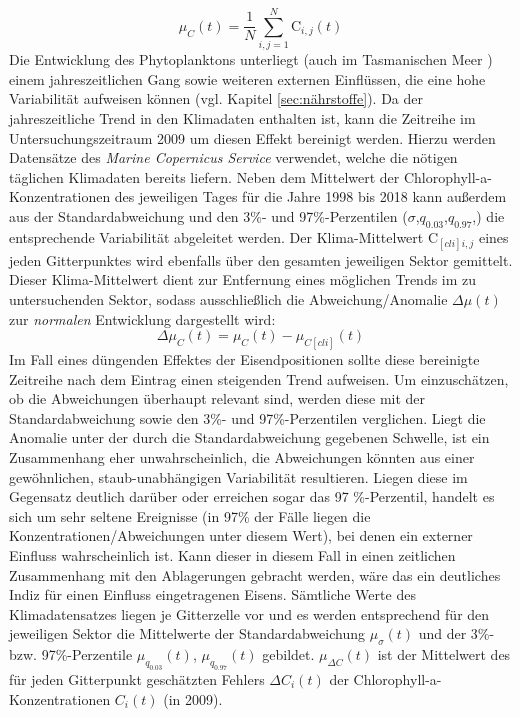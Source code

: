 \documentclass[12pt,a4paper,onecolumn,headheight=30pt]{scrartcl}
\begin{document}
\begin{equation}
\mu_C(t) = \frac{1}{N}\sum\limits_{i,j=1}^{N} \text{C}_{i,j}(t)
\end{equation}
Die Entwicklung des Phytoplanktons unterliegt (auch im Tasmanischen Meer \citep{Tilburg.2002}) einem jahreszeitlichen Gang sowie weiteren externen Einflüssen, die eine hohe Variabilität aufweisen können (vgl. Kapitel \ref{sec:nährstoffe}). Da der jahreszeitliche Trend in den Klimadaten enthalten ist, kann die Zeitreihe im Untersuchungszeitraum 2009 um diesen Effekt bereinigt werden. Hierzu werden Datensätze des \textit{Marine Copernicus Service} verwendet, welche die nötigen täglichen Klimadaten bereits liefern. Neben dem Mittelwert der Chlorophyll-a-Konzentrationen des jeweiligen Tages für die Jahre 1998 bis 2018 kann außerdem aus der Standardabweichung und den 3\%- und 97\%-Perzentilen ($\sigma$,$q_{0.03}$,$q_{0.97}$,) die entsprechende Variabilität abgeleitet werden. Der Klima-Mittelwert $\text{C}_{[cli]i,j}$ eines jeden Gitterpunktes wird ebenfalls über den gesamten jeweiligen Sektor gemittelt. Dieser Klima-Mittelwert dient zur Entfernung eines möglichen Trends im zu untersuchenden Sektor, sodass ausschließlich die Abweichung/Anomalie $\Delta \mu(t)$ zur \textit{normalen} Entwicklung dargestellt wird:
\begin{equation}
\Delta \mu_C(t) = \mu_C(t) - \mu_{C[cli]}(t) \label{eq:cli_anomalie}
\end{equation} 
Im Fall eines düngenden Effektes der Eisendpositionen sollte diese bereinigte Zeitreihe nach dem Eintrag einen steigenden Trend aufweisen. Um einzuschätzen, ob die Abweichungen überhaupt relevant sind, werden diese mit der Standardabweichung sowie den 3\%- und 97\%-Perzentilen verglichen. Liegt die Anomalie unter der durch die Standardabweichung gegebenen Schwelle, ist ein Zusammenhang eher unwahrscheinlich, die Abweichungen könnten aus einer gewöhnlichen, staub-unabhängigen Variabilität resultieren. Liegen diese im Gegensatz deutlich darüber oder erreichen sogar das 97 \%-Perzentil, handelt es sich um sehr seltene Ereignisse (in 97\% der Fälle liegen die Konzentrationen/Abweichungen unter diesem Wert), bei denen ein externer Einfluss wahrscheinlich ist. Kann dieser in diesem Fall in einen zeitlichen Zusammenhang mit den Ablagerungen gebracht werden, wäre das ein deutliches Indiz für einen Einfluss eingetragenen Eisens. Sämtliche Werte des Klimadatensatzes liegen je Gitterzelle vor und es werden entsprechend für den jeweiligen Sektor die Mittelwerte der Standardabweichung $\mu_\sigma (t)$ und der 3\%- bzw. 97\%-Perzentile  $\mu_{q_{0.03}}(t)$, $\mu_{q_{0.97}}(t)$ gebildet. $\mu_{\Delta C}(t)$ ist der Mittelwert des für jeden Gitterpunkt geschätzten Fehlers $ \Delta C_i(t)$ der Chlorophyll-a-Konzentrationen $C_i(t)$ (in 2009).
\end{document}
